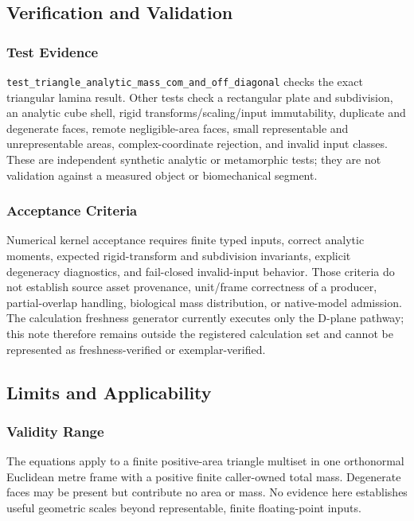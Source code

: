 \documentclass[
  american,
]{article}
\begin{document}
\subsection{Verification and
Validation}\label{verification-and-validation-1}

\subsubsection{Test Evidence}\label{test-evidence-1}

\texttt{test\_triangle\_analytic\_mass\_com\_and\_off\_diagonal} checks
the exact triangular lamina result. Other tests check a rectangular
plate and subdivision, an analytic cube shell, rigid
transforms/scaling/input immutability, duplicate and degenerate faces,
remote negligible-area faces, small representable and unrepresentable
areas, complex-coordinate rejection, and invalid input classes. These
are independent synthetic analytic or metamorphic tests; they are not
validation against a measured object or biomechanical segment.

\subsubsection{Acceptance Criteria}\label{acceptance-criteria-1}

Numerical kernel acceptance requires finite typed inputs, correct
analytic moments, expected rigid-transform and subdivision invariants,
explicit degeneracy diagnostics, and fail-closed invalid-input behavior.
Those criteria do not establish source asset provenance, unit/frame
correctness of a producer, partial-overlap handling, biological mass
distribution, or native-model admission. The calculation freshness
generator currently executes only the D-plane pathway; this note
therefore remains outside the registered calculation set and cannot be
represented as freshness-verified or exemplar-verified.

\subsection{Limits and Applicability}\label{limits-and-applicability-1}

\subsubsection{Validity Range}\label{validity-range-1}

The equations apply to a finite positive-area triangle multiset in one
orthonormal Euclidean metre frame with a positive finite caller-owned
total mass. Degenerate faces may be present but contribute no area or
mass. No evidence here establishes useful geometric scales beyond
representable, finite floating-point inputs.
\end{document}
